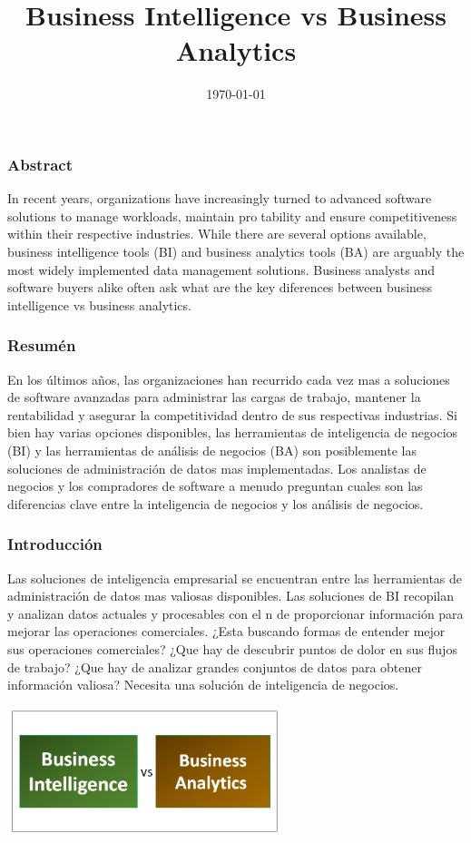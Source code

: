\documentclass[a4paper,12pt,twocolumn]{article}
\title{Business Intelligence vs Business Analytics}
\date{\today}
\begin{document}
\maketitle
\subsubsection*{Abstract}
In recent years, organizations have increasingly turned to advanced software
solutions to manage workloads, maintain protability and ensure competitiveness
within their respective industries. While there are several options available, business
intelligence tools (BI) and business analytics tools (BA) are arguably the most
widely implemented data management solutions. Business analysts and software
buyers alike often ask what are the key diferences between business intelligence vs business analytics.
\subsubsection*{Resumén}
En los últimos años, las organizaciones han recurrido cada vez mas a soluciones de software
avanzadas para administrar las cargas de trabajo, mantener la rentabilidad y asegurar la
competitividad dentro de sus respectivas industrias. Si bien hay varias opciones disponibles,
las herramientas de inteligencia de negocios (BI) y las herramientas de análisis de negocios
(BA) son posiblemente las soluciones de administración de datos mas implementadas. Los
analistas de negocios y los compradores de software a menudo preguntan cuales son las diferencias
clave entre la inteligencia de negocios y los análisis de negocios.
\subsubsection*{Introducci\'on}
Las soluciones de inteligencia empresarial se encuentran entre las herramientas
de administración de datos mas valiosas disponibles. Las soluciones de BI recopilan
y analizan datos actuales y procesables con el n de proporcionar información para
mejorar las operaciones comerciales. ¿Esta buscando formas de entender mejor sus
operaciones comerciales? ¿Que hay de descubrir puntos de dolor en sus flujos de
trabajo? ¿Que hay de analizar grandes conjuntos de datos para obtener información
valiosa? Necesita una solución de inteligencia de negocios.
\begin{center}
\includegraphics[width=8cm]{./Imagenes/bivsba}
\end{center}
\end{document}
